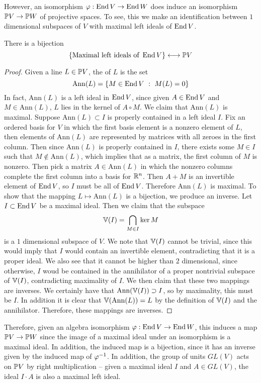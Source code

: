 %
However, an isomorphism $\varphi : \End V \to \End W$ does induce an isomorphism
$\P V \to \P W$ of projective spaces. To see, this we make an identification
between $1$ dimensional subspaces of $V$ with maximal left ideals of $\End V$.
%
\begin{prop}
There is a bijection
\[
\set{\text{Maximal left ideals of } \End V} \longleftrightarrow \P V
\]
\end{prop}
%
\begin{proof}
Given a line $L \in \P V$, the  of $L$ is the set
\[
\mathrm{Ann}(L) = \set{M \in \End V ~:~ M(L) = 0}
\]
In fact, $\mathrm{Ann}(L)$
is a left ideal in $\End V$, since given $A \in \End V$ and $M \in \mathrm{Ann}(L)$,
$L$ lies in the kernel of $A \circ M$. We claim that $\mathrm{Ann}(L)$ is maximal.
Suppose $\mathrm{Ann}(L) \subset I$ is properly contained in a left ideal $I$.
Fix an ordered basis for $V$ in which the first basis element is a
nonzero element of $L$, then elements of $\mathrm{Ann}(L)$ are represented by
matrices with all zeroes in the first column. Then since $\mathrm{Ann}(L)$ is
properly contained in $I$, there exists some $M \in I$ such that
$M \notin \mathrm{Ann}(L)$, which implies that as a matrix, the first column
of $M$ is nonzero. Then pick a matrix $A \in \mathrm{Ann}(L)$ in which
the nonzero columns complete the first column into a basis for $\R^n$. Then
$A + M$ is an invertible element of $\End V$, so $I$ must be all of $\End V$.
Therefore $\mathrm{Ann}(L)$ is maximal. To show that the mapping
$L \mapsto \mathrm{Ann}(L)$ is a bijection, we produce an inverse. Let
$I \subset \End V$ be a maximal ideal. Then we claim that the subspace
\[
\V(I) = \bigcap_{M \in I}\ker M
\]
is a $1$ dimensional subspace of $V$. We note that $\V(I)$ cannot be trivial,
since this would imply that $I$ would contain an invertible element, contradicting
that it is a proper ideal. We also see that it cannot be higher than $2$ dimensional,
since otherwise, $I$ woud be contained in the annihilator of a proper nontrivial
subspace of $\V(I)$, contradicting maximality of $I$. We then claim that
these two mappings are inverses. We certainly have that
$\mathrm{Ann}(\V(I)) \supset I$, so by maximality, this must be $I$. In addition
it is clear that $\V(\mathrm{Ann}(L)) = L$ by the definition of $\V(I)$ and
the annihilator. Therefore, these mappings are inverses.
\end{proof}
%
Therefore, given an algebra isomorphism $\varphi : \End V \to \End W$, this
induces a map $\P V \to \P W$ since the image of a maximal ideal under an
isomorphism is a maximal ideal. In addition, the induced map is a bijection,
since it has an inverse given by the induced map of $\varphi\inv$. In
addition, the group of units $GL(V)$ acts on $\P V$ by right multiplication --
given a maximal ideal $I$ and $A \in GL(V)$, the ideal $I \cdot A$ is also
a maximal left ideal. \\

